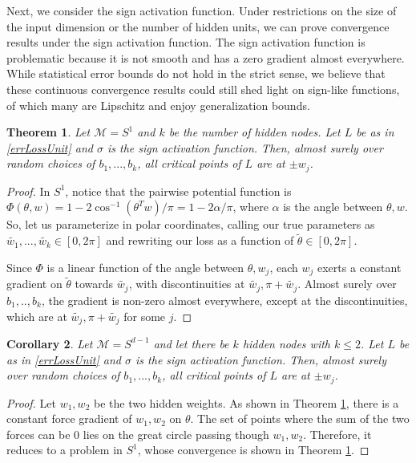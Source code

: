 \documentclass{article}
\newtheorem{theorem}{Theorem}[section]
\newtheorem{corollary}[theorem]{Corollary}
\begin{document}
Next, we consider the sign activation function. Under restrictions on the size of the input dimension or the number of hidden units, we can prove convergence results under the sign activation function. The sign activation function is problematic because it is not smooth and has a zero gradient almost everywhere. While statistical error bounds do not hold in the strict sense, we believe that these continuous convergence results could still shed light on sign-like functions, of which many are Lipschitz and enjoy generalization bounds. 

\begin{theorem}
\label{SignConv}
Let $\mathcal{M} = S^1$ and $k$ be the number of hidden nodes. Let $L$ be as in \eqref{errLossUnit} and $\sigma$ is the sign activation function. Then, almost surely over random choices of $b_1,...,b_k$, all critical points of $L$ are at $\pm w_j$.
\end{theorem}

\begin{proof}
In $S^1$, notice that the pairwise potential function is $\Phi(\theta,w) = 1 - 2\cos^{-1}(\theta^Tw)/\pi = 1 - 2\alpha/\pi$, where $\alpha$ is the angle between $\theta, w$. So, let us parameterize in polar coordinates, calling our true parameters as $\widetilde{w_1},...,\widetilde{w_k} \in [0,2\pi]$ and rewriting our loss as a function of $\widetilde{\theta} \in [0,2\pi]$. 

Since $\Phi$ is a linear function of the angle between $\theta, w_j$, each $w_j$ exerts a constant gradient on $\widetilde{\theta}$ towards $\widetilde{w_j}$, with discontinuities at $\widetilde{w_j},\pi+\widetilde{w_j}$. Almost surely over $b_1,..,b_k$, the gradient is non-zero almost everywhere, except at the discontinuities, which are at $\widetilde{w_j}, \pi+\widetilde{w_j}$ for some $j$. 
\end{proof}



\begin{corollary}
\label{SignConv2}
Let $\mathcal{M} = S^{d-1}$ and let there be $k$ hidden nodes with $k\leq 2$. Let $L$ be as in \eqref{errLossUnit} and $\sigma$ is the sign activation function. Then, almost surely over random choices of $b_1,...,b_k$, all critical points of $L$ are at $\pm w_j$.
\end{corollary}

\begin{proof}
Let $w_1,w_2$ be the two hidden weights. As shown in Theorem \ref{SignConv}, there is a constant force gradient
of $w_1, w_2$ on $\theta$. The set of points where the sum of the two forces can be 0 lies on the great circle passing though $w_1,w_2$. Therefore, it reduces to a problem in $S^1$, whose convergence is shown in Theorem \ref{SignConv}.
\end{proof}
\end{document}
